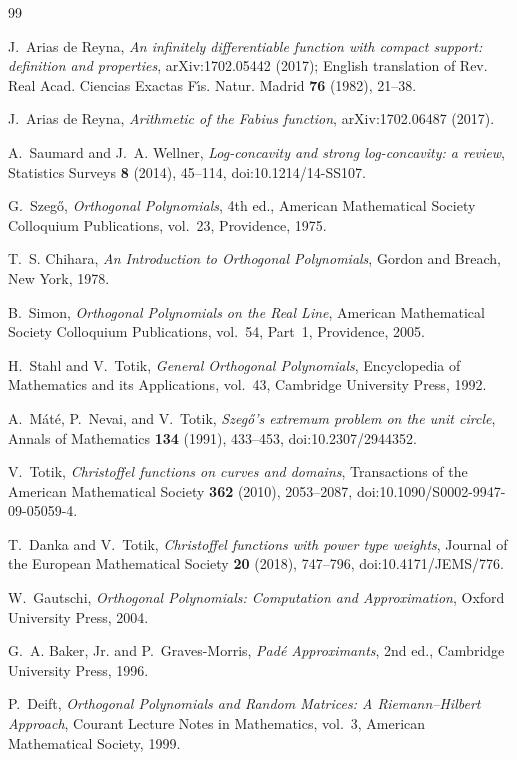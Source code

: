 \documentclass[11pt,oneside]{article}
\theoremstyle{definition}
\theoremstyle{remark}
\numberwithin{equation}{section}
\begin{document}
\begin{thebibliography}{99}

J.~Arias de Reyna,
\emph{An infinitely differentiable function with compact support: definition
and properties}, arXiv:1702.05442 (2017); English translation of
Rev. Real Acad. Ciencias Exactas F\'{\i}s. Natur. Madrid \textbf{76} (1982),
21--38.

J.~Arias de Reyna,
\emph{Arithmetic of the Fabius function}, arXiv:1702.06487 (2017).

A.~Saumard and J.~A. Wellner,
\emph{Log-concavity and strong log-concavity: a review},
Statistics Surveys \textbf{8} (2014), 45--114,
doi:10.1214/14-SS107.

G.~Szeg\H{o},
\emph{Orthogonal Polynomials}, 4th ed.,
American Mathematical Society Colloquium Publications, vol.~23,
Providence, 1975.

T.~S. Chihara,
\emph{An Introduction to Orthogonal Polynomials},
Gordon and Breach, New York, 1978.

B.~Simon,
\emph{Orthogonal Polynomials on the Real Line},
American Mathematical Society Colloquium Publications, vol.~54, Part~1,
Providence, 2005.

H.~Stahl and V.~Totik,
\emph{General Orthogonal Polynomials},
Encyclopedia of Mathematics and its Applications, vol.~43,
Cambridge University Press, 1992.

A.~M\'at\'e, P.~Nevai, and V.~Totik,
\emph{Szeg\H{o}'s extremum problem on the unit circle},
Annals of Mathematics \textbf{134} (1991), 433--453,
doi:10.2307/2944352.

V.~Totik,
\emph{Christoffel functions on curves and domains},
Transactions of the American Mathematical Society \textbf{362} (2010),
2053--2087, doi:10.1090/S0002-9947-09-05059-4.

T.~Danka and V.~Totik,
\emph{Christoffel functions with power type weights},
Journal of the European Mathematical Society \textbf{20} (2018), 747--796,
doi:10.4171/JEMS/776.

W.~Gautschi,
\emph{Orthogonal Polynomials: Computation and Approximation},
Oxford University Press, 2004.

G.~A. Baker, Jr. and P.~Graves-Morris,
\emph{Pad\'e Approximants}, 2nd ed.,
Cambridge University Press, 1996.

P.~Deift,
\emph{Orthogonal Polynomials and Random Matrices: A Riemann--Hilbert Approach},
Courant Lecture Notes in Mathematics, vol.~3,
American Mathematical Society, 1999.

\end{thebibliography}
\end{document}
